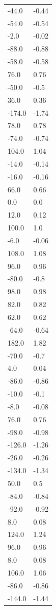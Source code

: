\begin{longtable}{ll}
-44.0 & -0.44 \\
-54.0 & -0.54 \\
-2.0 & -0.02 \\
-88.0 & -0.88 \\
-58.0 & -0.58 \\
76.0 & 0.76 \\
-50.0 & -0.5 \\
36.0 & 0.36 \\
-174.0 & -1.74 \\
78.0 & 0.78 \\
-74.0 & -0.74 \\
104.0 & 1.04 \\
-14.0 & -0.14 \\
-16.0 & -0.16 \\
66.0 & 0.66 \\
0.0 & 0.0 \\
12.0 & 0.12 \\
100.0 & 1.0 \\
-6.0 & -0.06 \\
108.0 & 1.08 \\
96.0 & 0.96 \\
-80.0 & -0.8 \\
98.0 & 0.98 \\
82.0 & 0.82 \\
62.0 & 0.62 \\
-64.0 & -0.64 \\
182.0 & 1.82 \\
-70.0 & -0.7 \\
4.0 & 0.04 \\
-86.0 & -0.86 \\
-10.0 & -0.1 \\
-8.0 & -0.08 \\
76.0 & 0.76 \\
-98.0 & -0.98 \\
-126.0 & -1.26 \\
-26.0 & -0.26 \\
-134.0 & -1.34 \\
50.0 & 0.5 \\
-84.0 & -0.84 \\
-92.0 & -0.92 \\
8.0 & 0.08 \\
124.0 & 1.24 \\
96.0 & 0.96 \\
8.0 & 0.08 \\
106.0 & 1.06 \\
-86.0 & -0.86 \\
-144.0 & -1.44 \\

\end{longtable}
